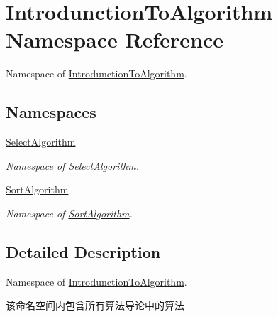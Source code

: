 \hypertarget{namespace_introdunction_to_algorithm}{}\section{Introdunction\+To\+Algorithm Namespace Reference}
\label{namespace_introdunction_to_algorithm}


Namespace of \hyperlink{namespace_introdunction_to_algorithm}{Introdunction\+To\+Algorithm}.  


\subsection*{Namespaces}
\begin{DoxyCompactItemize}
\item 
 \hyperlink{namespace_introdunction_to_algorithm_1_1_select_algorithm}{Select\+Algorithm}
\begin{DoxyCompactList}\small\item\em Namespace of \hyperlink{namespace_introdunction_to_algorithm_1_1_select_algorithm}{Select\+Algorithm}. \end{DoxyCompactList}\item 
 \hyperlink{namespace_introdunction_to_algorithm_1_1_sort_algorithm}{Sort\+Algorithm}
\begin{DoxyCompactList}\small\item\em Namespace of \hyperlink{namespace_introdunction_to_algorithm_1_1_sort_algorithm}{Sort\+Algorithm}. \end{DoxyCompactList}\end{DoxyCompactItemize}


\subsection{Detailed Description}
Namespace of \hyperlink{namespace_introdunction_to_algorithm}{Introdunction\+To\+Algorithm}. 

该命名空间内包含所有算法导论中的算法 
